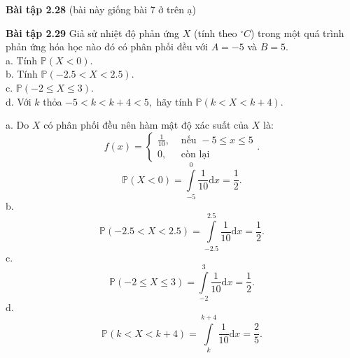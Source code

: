 \documentclass[12pt,a4paper]{article}
\begin{document}
\begin{mybox}
    \textbf{Bài tập 2.28} (bài này giống bài 7 ở trên ạ)
\end{mybox}

\begin{mybox}
    \textbf{Bài tập 2.29} Giả sử nhiệt độ phản ứng $X$ (tính theo $^\circ C$) trong một quá trình phản ứng hóa học nào đó có phân phối đều 
    với $A = -5$ và $B = 5.$\\
    a. Tính $\mathbb{P} \left( { X < 0} \right).$\\
    b. Tính $\mathbb{P} \left( {-2.5 < X < 2.5} \right).$\\
    c. $\mathbb{P} \left( {-2 \leqslant X \leqslant 3} \right).$\\
    d. Với $k$ thỏa $-5 < k < k + 4 < 5,$ hãy tính $\mathbb{P} \left( {k < X < k + 4} \right).$
\end{mybox}
    a. Do $X$ có phân phối đều nên hàm mật độ xác suất của $X$ là:
    $$f \left( x \right) = 
    \begin{cases}
        \frac{1}{10}, &\text{ nếu } -5 \leqslant x \leqslant 5\\
        0, &\text{ còn lại } 
    \end{cases}
    .$$
    $$\mathbb{P} \left( { X < 0} \right) = \int\limits_{-5}^{0}{\frac{1}{10}\mathrm{d}x} = \frac{1}{2}.$$
    b. $$\mathbb{P} \left( {-2.5 < X < 2.5} \right) = \int\limits_{-2.5}^{2.5}{\frac{1}{10}\mathrm{d}x} = \frac{1}{2}.$$
    c. $$\mathbb{P} \left( {-2 \leqslant X \leqslant 3} \right) = \int\limits_{-2}^{3}{\frac{1}{10}\mathrm{d}x} = \frac{1}{2}.$$
    d. $$\mathbb{P} \left( {k < X < k + 4} \right) = \int\limits_{k}^{k + 4}{\frac{1}{10}\mathrm{d}x} = \frac{2}{5}.$$
\end{document}

